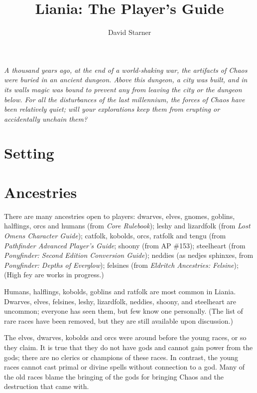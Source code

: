 \documentclass{report}
\title{Liania: The Player's Guide}
\author{David Starner}
\begin{document}
\maketitle
\emph{A thousand years ago, at the end of a world-shaking war, the artifacts of
Chaos were buried in an ancient dungeon. Above this dungeon, a city was built,
and in its walls magic was bound to prevent any from leaving the city or the
dungeon below. For all the disturbances of the last millennium, the forces
of Chaos have been relatively quiet; will your explorations keep them from
erupting or accidentally unchain them?}

\chapter{Setting}


\chapter{Ancestries}

There are many ancestries open to players: dwarves, elves, gnomes, goblins,
halflings, orcs and humans (from \emph{Core Rulebook}); leshy and lizard\-folk (from
\emph{Lost Omens Character Guide}); catfolk, kobolds, orcs, ratfolk and tengu (from
\emph{Pathfinder Advanced Player's Guide}; shoony (from AP \#153);
steel\-heart (from \emph{Pony\-finder: Second Edition Con\-version Guide}); neddies (as nedjes sphinxes, from \emph{Pony\-finder:
Depths of Everglow}); felsines (from \emph{Eldritch Ancestries: Felsine});
(High fey are works in progress.)

Humans, halflings, kobolds, goblins and rat\-folk are most common in Liania.
Dwarves, elves, felsines, leshy, lizardfolk, neddies, shoony, and steelheart are
uncommon; everyone has seen them, but few know one personally. (The list of
rare races have been removed, but they are still available upon discussion.)

The elves, dwarves, kobolds and orcs were around before the young races, or so they claim.
It is true that they do not have gods and cannot gain power from the gods; there
are no clerics or champions of these races. In contrast, the young races cannot
cast primal or divine spells without connection to a god. Many of the old races
blame the bringing of the gods for bringing Chaos and the destruction that came with.
\end{document}
